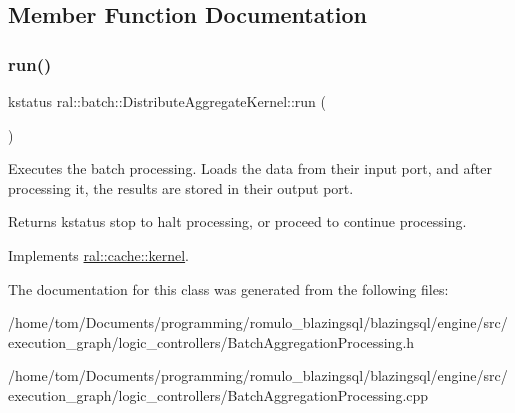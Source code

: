 \subsection{Member Function Documentation}
\mbox{\label{classral_1_1batch_1_1DistributeAggregateKernel_a9508b135d44027058ce72ace2ffba98f}} 
\subsubsection{\texorpdfstring{run()}{run()}}
{\footnotesize\ttfamily kstatus ral\+::batch\+::\+Distribute\+Aggregate\+Kernel\+::run (\begin{DoxyParamCaption}{ }\end{DoxyParamCaption})\hspace{0.3cm}{\ttfamily [virtual]}}



Executes the batch processing. Loads the data from their input port, and after processing it, the results are stored in their output port. 

\begin{DoxyReturn}{Returns}
kstatus \textquotesingle{}stop\textquotesingle{} to halt processing, or \textquotesingle{}proceed\textquotesingle{} to continue processing. 
\end{DoxyReturn}


Implements \hyperlink{classral_1_1cache_1_1kernel_a735b081cccae9574924e74ea6d293ef7}{ral\+::cache\+::kernel}.



The documentation for this class was generated from the following files\+:\begin{DoxyCompactItemize}
\item 
/home/tom/\+Documents/programming/romulo\+\_\+blazingsql/blazingsql/engine/src/execution\+\_\+graph/logic\+\_\+controllers/Batch\+Aggregation\+Processing.\+h\item 
/home/tom/\+Documents/programming/romulo\+\_\+blazingsql/blazingsql/engine/src/execution\+\_\+graph/logic\+\_\+controllers/Batch\+Aggregation\+Processing.\+cpp\end{DoxyCompactItemize}
